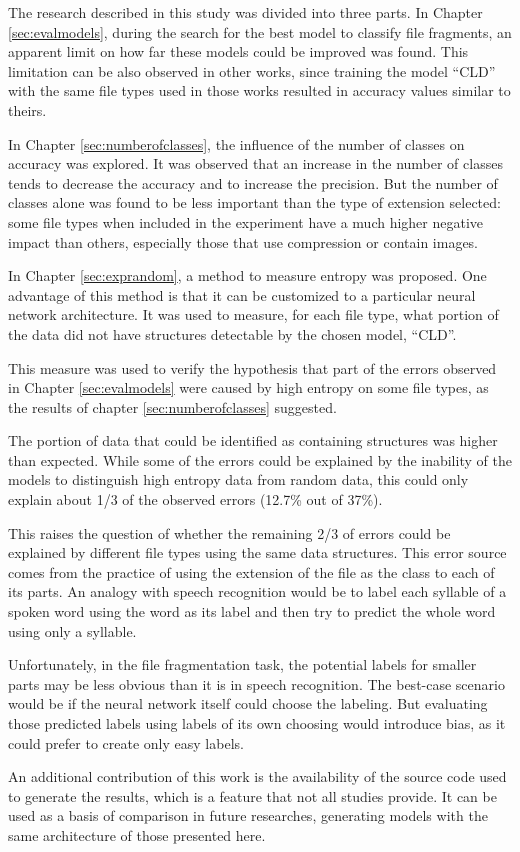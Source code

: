 
The research described in this study was divided into three parts.
In Chapter \ref{sec:evalmodels}, during the search for the best model to classify file fragments, an apparent limit on how far these models could be improved was found. This limitation can be also observed in other works, since training the model ``CLD'' with the same file types used in those works resulted in accuracy values similar to theirs.

In Chapter \ref{sec:numberofclasses}, the influence of the number of classes on accuracy was explored. It was observed that an increase in the number of classes tends to decrease the accuracy and to increase the precision. But the number of classes alone was found to be less important than the type of extension selected: some file types when included in the experiment have a much higher negative impact than others, especially those that use compression or contain images.

In Chapter \ref{sec:exprandom}, a method to measure entropy was proposed. One advantage of this method is that it can be customized to a particular neural network architecture. It was used to measure, for each file type, what portion of the data did not have structures detectable by the chosen model, ``CLD''.

This measure was used to verify the hypothesis that part of the errors observed in Chapter \ref{sec:evalmodels} were caused by high entropy on some file types, as the results of chapter  \ref{sec:numberofclasses} suggested.

The portion of data that could be identified as containing structures was higher than expected. While some of the errors could be explained by the inability of the models to distinguish  high entropy data from random data, this could only explain about 1/3 of the observed errors (12.7\% out of 37\%).

This raises the question of whether the remaining 2/3 of errors could be explained by different file types using the same data structures. This error source comes from the practice of using the extension of the file as the class to each of its parts. An analogy with speech recognition would be to label each syllable of a spoken word using the word as its label and then try to predict the whole word using only a syllable.

Unfortunately, in the file fragmentation task, the potential labels for smaller parts may be less obvious than it is in speech recognition. The best-case scenario would be if the neural network itself could choose the labeling. But evaluating those predicted labels using labels of its own choosing would introduce bias, as it could prefer to create only easy labels.

An additional contribution of this work is the availability of the source code used to generate the results, which is a feature that not all studies provide. It can be used as a basis of comparison in future researches, generating models with the same architecture of those presented here.